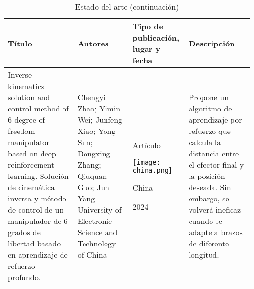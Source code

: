 \newpage
\begin{table}[htb]
	\caption{Estado del arte (continuación)}
	\centering
	\raggedright
	\begin{tabular}{p{3.8cm}p{3.8cm}p{3.8cm}p{3.8cm}}
		\textbf{Título} & \textbf{Autores} & \textbf{Tipo de publicación, lugar y fecha} & \textbf{Descripción} \\ 
		\midrule
		Inverse kinematics solution and control method of 6-degree-of-freedom manipulator based on deep reinforcement learning. \newline\newline
		Solución de cinemática inversa y método de control de un manipulador de 6 grados de libertad basado en aprendizaje de refuerzo profundo. &  
		Chengyi Zhao; Yimin Wei; Junfeng Xiao; Yong Sun; Dongxing Zhang; Qiuquan Guo; Jun Yang \newline\newline 
		University of Electronic Science and Technology of China & 
		\begin{center}Artículo \par \texttt{[image: china.png]} \par China \par 2024\end{center} & 
		Propone un algoritmo de aprendizaje por refuerzo que calcula la distancia entre el efector final y la posición deseada. \newline\newline Sin embargo, se volverá ineficaz cuando se adapte a brazos de diferente longitud. \\
	\end{tabular}
\end{table}